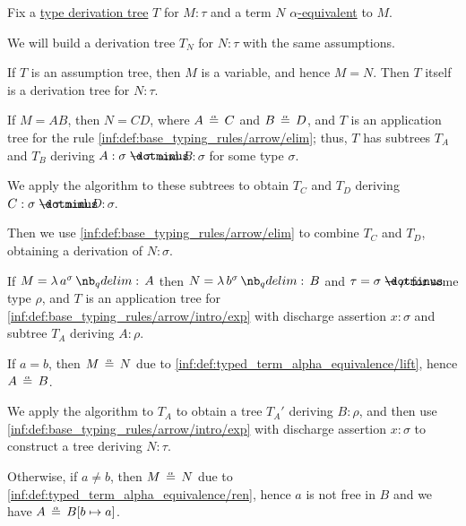 \begin{algorithm}\label{alg:simply_typed_alpha_conversion}
  Fix a \hyperref[def:type_derivation_tree]{type derivation tree} \( T \) for \( M: \tau \) and a term \( N \) \hyperref[def:typed_term_alpha_equivalence]{\( \alpha \)-equivalent} to \( M \).

  We will build a derivation tree \( T_N \) for \( N: \tau \) with the same assumptions.

  \begin{thmenum}
     If \( T \) is an assumption tree, then \( M \) is a variable, and hence \( M = N \). Then \( T \) itself is a derivation tree for \( N: \tau \).

     If \( M = AB \), then \( N = CD \), where \( A \aequiv C \) and \( B \aequiv D \), and \( T \) is an application tree for the rule \ref{inf:def:base_typing_rules/arrow/elim}; thus, \( T \) has subtrees \( T_A \) and \( T_B \) deriving \( A: \sigma \synimplies \tau \) and \( B: \sigma \) for some type \( \sigma \).

    We apply the algorithm to these subtrees to obtain \( T_C \) and \( T_D \) deriving \( C: \sigma \synimplies \tau \) and \( D: \sigma \).

    Then we use \ref{inf:def:base_typing_rules/arrow/elim} to combine \( T_C \) and \( T_D \), obtaining a derivation of \( N: \sigma \).

     If \( M = \qabs {a^\sigma} A \) then \( N = \qabs {b^\sigma} B \) and \( \tau = \sigma \synimplies \rho \) for some type \( \rho \), and \( T \) is an application tree for \ref{inf:def:base_typing_rules/arrow/intro/exp} with discharge assertion \( x: \sigma \) and subtree \( T_A \) deriving \( A: \rho \).

    \begin{thmenum}
       If \( a = b \), then \( M \aequiv N \) due to \ref{inf:def:typed_term_alpha_equivalence/lift}, hence \( A \aequiv B \).

      We apply the algorithm to \( T_A \) to obtain a tree \( T_A' \) deriving \( B: \rho \), and then use \ref{inf:def:base_typing_rules/arrow/intro/exp} with discharge assertion \( x: \sigma \) to construct a tree deriving \( N: \tau \).

       Otherwise, if \( a \neq b \), then \( M \aequiv N \) due to \ref{inf:def:typed_term_alpha_equivalence/ren}, hence \( a \) is not free in \( B \) and we have \( A \aequiv B[b \mapsto a] \).


\end{thmenum}
\end{thmenum}
\end{algorithm}
